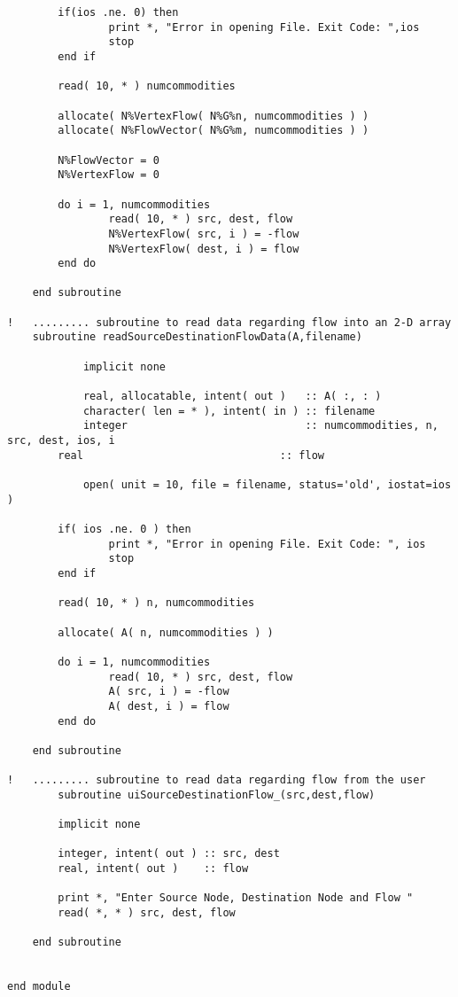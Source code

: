 \documentclass[10pt,a4paper,margin = 1.25cm]{article}
\begin{document}
\begin{lstlisting}
        if(ios .ne. 0) then
        		print *, "Error in opening File. Exit Code: ",ios
        		stop
        end if
        
        read( 10, * ) numcommodities
  
        allocate( N%VertexFlow( N%G%n, numcommodities ) )
        allocate( N%FlowVector( N%G%m, numcommodities ) )
        
        N%FlowVector = 0
        N%VertexFlow = 0
              
        do i = 1, numcommodities
        		read( 10, * ) src, dest, flow
        		N%VertexFlow( src, i ) = -flow
        		N%VertexFlow( dest, i ) = flow
        end do
        
    end subroutine
    
!   ......... subroutine to read data regarding flow into an 2-D array    
    subroutine readSourceDestinationFlowData(A,filename)
    		
    		implicit none
    		
    		real, allocatable, intent( out )   :: A( :, : )
    		character( len = * ), intent( in ) :: filename
    		integer                            :: numcommodities, n, src, dest, ios, i
        real                               :: flow
        
    		open( unit = 10, file = filename, status='old', iostat=ios )
        
        if( ios .ne. 0 ) then
        		print *, "Error in opening File. Exit Code: ", ios
        		stop
        end if
        
        read( 10, * ) n, numcommodities
        
        allocate( A( n, numcommodities ) )
        
        do i = 1, numcommodities
        		read( 10, * ) src, dest, flow
        		A( src, i ) = -flow
        		A( dest, i ) = flow
        end do
        
    end subroutine
    		
!   ......... subroutine to read data regarding flow from the user		
		subroutine uiSourceDestinationFlow_(src,dest,flow)
        
        implicit none
        
        integer, intent( out ) :: src, dest
        real, intent( out )    :: flow
        
        print *, "Enter Source Node, Destination Node and Flow "
        read( *, * ) src, dest, flow
        
    end subroutine
    
    
end module 
\end{lstlisting}
\end{document}
